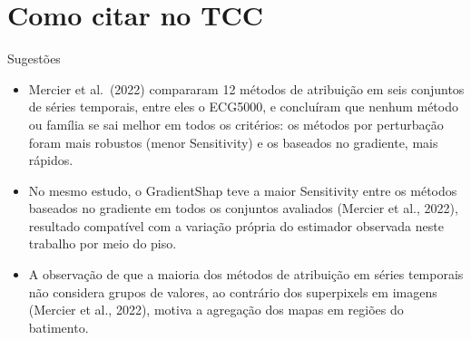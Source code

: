 \documentclass[11pt,a4paper]{article}
\begin{document}
\section{Como citar no TCC}
\begin{infobox}[ok]{Sugestões}
\begin{itemize}
\item Mercier et al.\ (2022) compararam 12 métodos de atribuição em seis conjuntos de séries temporais, entre eles o ECG5000, e concluíram que nenhum método ou família se sai melhor em todos os critérios: os métodos por perturbação foram mais robustos (menor Sensitivity) e os baseados no gradiente, mais rápidos.
\item No mesmo estudo, o GradientShap teve a maior Sensitivity entre os métodos baseados no gradiente em todos os conjuntos avaliados (Mercier et al., 2022), resultado compatível com a variação própria do estimador observada neste trabalho por meio do piso.
\item A observação de que a maioria dos métodos de atribuição em séries temporais não considera grupos de valores, ao contrário dos superpixels em imagens (Mercier et al., 2022), motiva a agregação dos mapas em regiões do batimento.
\end{itemize}
\end{infobox}
\end{document}
